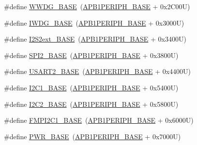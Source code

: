 \begin{DoxyCompactItemize}
\item 
\#define \hyperlink{group___peripheral__registers__structures_ga9a5bf4728ab93dea5b569f5b972cbe62}{W\+W\+D\+G\+\_\+\+B\+A\+SE}~(\hyperlink{group___peripheral__memory__map_ga45666d911f39addd4c8c0a0ac3388cfb}{A\+P\+B1\+P\+E\+R\+I\+P\+H\+\_\+\+B\+A\+SE} + 0x2\+C00\+U)
\item 
\#define \hyperlink{group___peripheral__registers__structures_ga8543ee4997296af5536b007cd4748f55}{I\+W\+D\+G\+\_\+\+B\+A\+SE}~(\hyperlink{group___peripheral__memory__map_ga45666d911f39addd4c8c0a0ac3388cfb}{A\+P\+B1\+P\+E\+R\+I\+P\+H\+\_\+\+B\+A\+SE} + 0x3000\+U)
\item 
\#define \hyperlink{group___peripheral__registers__structures_gaa5f7b241ed5b756decd835300c9e7bc9}{I2\+S2ext\+\_\+\+B\+A\+SE}~(\hyperlink{group___peripheral__memory__map_ga45666d911f39addd4c8c0a0ac3388cfb}{A\+P\+B1\+P\+E\+R\+I\+P\+H\+\_\+\+B\+A\+SE} + 0x3400\+U)
\item 
\#define \hyperlink{group___peripheral__registers__structures_gac3e357b4c25106ed375fb1affab6bb86}{S\+P\+I2\+\_\+\+B\+A\+SE}~(\hyperlink{group___peripheral__memory__map_ga45666d911f39addd4c8c0a0ac3388cfb}{A\+P\+B1\+P\+E\+R\+I\+P\+H\+\_\+\+B\+A\+SE} + 0x3800\+U)
\item 
\#define \hyperlink{group___peripheral__registers__structures_gade83162a04bca0b15b39018a8e8ec090}{U\+S\+A\+R\+T2\+\_\+\+B\+A\+SE}~(\hyperlink{group___peripheral__memory__map_ga45666d911f39addd4c8c0a0ac3388cfb}{A\+P\+B1\+P\+E\+R\+I\+P\+H\+\_\+\+B\+A\+SE} + 0x4400\+U)
\item 
\#define \hyperlink{group___peripheral__registers__structures_gacd72dbffb1738ca87c838545c4eb85a3}{I2\+C1\+\_\+\+B\+A\+SE}~(\hyperlink{group___peripheral__memory__map_ga45666d911f39addd4c8c0a0ac3388cfb}{A\+P\+B1\+P\+E\+R\+I\+P\+H\+\_\+\+B\+A\+SE} + 0x5400\+U)
\item 
\#define \hyperlink{group___peripheral__registers__structures_ga04bda70f25c795fb79f163b633ad4a5d}{I2\+C2\+\_\+\+B\+A\+SE}~(\hyperlink{group___peripheral__memory__map_ga45666d911f39addd4c8c0a0ac3388cfb}{A\+P\+B1\+P\+E\+R\+I\+P\+H\+\_\+\+B\+A\+SE} + 0x5800\+U)
\item 
\#define \hyperlink{group___peripheral__registers__structures_gac6e36f905b89086de0fceda4325a9a8e}{F\+M\+P\+I2\+C1\+\_\+\+B\+A\+SE}~(\hyperlink{group___peripheral__memory__map_ga45666d911f39addd4c8c0a0ac3388cfb}{A\+P\+B1\+P\+E\+R\+I\+P\+H\+\_\+\+B\+A\+SE} + 0x6000\+U)
\item 
\#define \hyperlink{group___peripheral__registers__structures_gac691ec23dace8b7a649a25acb110217a}{P\+W\+R\+\_\+\+B\+A\+SE}~(\hyperlink{group___peripheral__memory__map_ga45666d911f39addd4c8c0a0ac3388cfb}{A\+P\+B1\+P\+E\+R\+I\+P\+H\+\_\+\+B\+A\+SE} + 0x7000\+U)

\end{DoxyCompactItemize}

